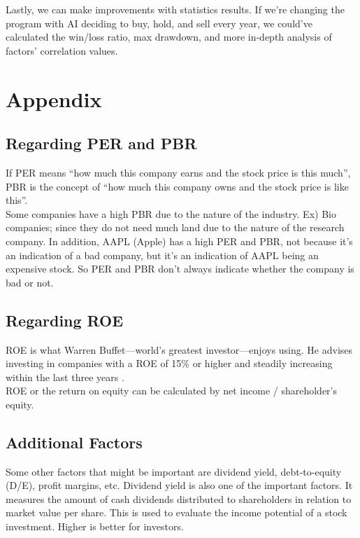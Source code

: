 \documentclass[fontsize=11pt]{article}
\begin{document}
Lastly, we can make improvements with statistics results. If we're changing the program with AI deciding to buy, hold, and sell every year, we could've calculated the win/loss ratio, max drawdown, and more in-depth analysis of factors' correlation values.

\pagebreak
\section{Appendix}

\subsection{Regarding PER and PBR}
If PER means “how much this company earns and the stock price is this much”, PBR is the concept of “how much this company owns and the stock price is like this”.
\\

Some companies have a high PBR due to the nature of the industry.  Ex) Bio companies; since they do not need much land due to the nature of the research company. In addition, AAPL (Apple)  has a high PER and PBR, not because it’s an indication of a bad company, but it’s an indication of AAPL being an expensive stock. So PER and PBR don’t always indicate whether the company is bad or not.

\subsection{Regarding ROE}
ROE is what Warren Buffet—world’s greatest investor—enjoys using. He advises investing in companies with a ROE of 15\% or higher and steadily increasing within the last three years \cite{investopediawarren}.
\\

ROE or the return on equity can be calculated by net income / shareholder’s equity.

\subsection{Additional Factors}
Some other factors that might be important are dividend yield, debt-to-equity (D/E), profit margins, etc. Dividend yield is also one of the important factors. It measures the amount of cash dividends distributed to shareholders in relation to market value per share. This is used to evaluate the income potential of a stock investment. Higher is better for investors.
\end{document}
